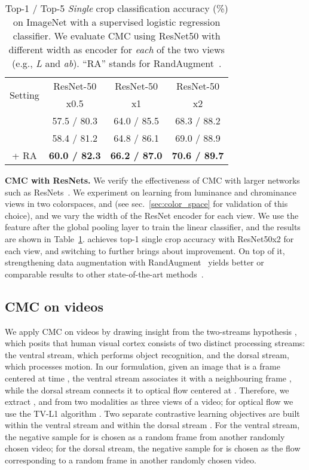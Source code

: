 \documentclass[10pt,twocolumn,letterpaper]{article}
\newcommand{\header}[1]{\vspace{0.05in}\noindent\textbf{#1}}
\newcommand{\citep}[1]{\cite{#1}}
\begin{document}
\begin{table}[t]
    \setlength{\tabcolsep}{5pt}
	\centering
    \begin{tabular}{c|ccc}
    \multirow{2}{*}{Setting} & ResNet-50 & ResNet-50 & ResNet-50 \\
     & x0.5 & x1 & x2 \\
    \shline
     &        57.5 / 80.3 & 64.0 / 85.5 & 68.3 / 88.2\\
     &      58.4 / 81.2 & 64.8 / 86.1 & 69.0 / 88.9\\
     + RA & \textbf{60.0 / 82.3} & \textbf{66.2 / 87.0} & \textbf{70.6 / 89.7}\\
    \end{tabular}
    \caption{\small{Top-1 / Top-5 \emph{Single} crop classification accuracy (\%) on ImageNet with a supervised logistic regression classifier. We evaluate CMC using ResNet50 with different width as encoder for \emph{each} of the two views (e.g., \emph{L} and \emph{ab}). ``RA'' stands for RandAugment~\cite{cubuk2019randaugment}.}}
    \vspace{-5pt}
    \label{tbl:resnet}
\end{table}
 \header{CMC with ResNets.} We verify the effectiveness of CMC with larger networks such as ResNets~\cite{he2016deep}. 
We experiment on learning from luminance and chrominance views in two colorspaces,  and  (see sec.~\ref{sec:color_space} for validation of this choice), and we vary the width of the ResNet encoder for each view. We use the feature after the global pooling layer to train the linear classifier, and the results are shown in Table~\ref{tbl:resnet}.  achieves  top-1 single crop accuracy with ResNet50x2 for each view, and switching to  further brings about  improvement. On top of it, strengthening data augmentation with RandAugment~\cite{cubuk2019randaugment} yields better or comparable results to other state-of-the-art methods~\cite{kolesnikov2019revisiting,wu2018unsupervised,zhuang2019local,he2019momentum,misra2019self,donahue2019large,henaff2019data,bachman2019learning}.

 \subsection{CMC on videos}\label{exp:video}
We apply CMC on videos by drawing insight from the two-streams hypothesis \citep{schneider1969two,goodale1992separate}, which posits that human visual cortex consists of two distinct processing streams: the ventral stream, which performs object recognition, and the dorsal stream, which processes motion. In our formulation, given an image  that is a frame centered at time , the ventral stream associates it with a neighbouring frame , while the dorsal stream connects it to optical flow  centered at . Therefore, we extract ,  and  from two modalities as three views of a video; for optical flow we use the TV-L1 algorithm \citep{zach2007duality}. Two separate contrastive learning objectives are built within the ventral stream  and within the dorsal stream . For the ventral stream, the negative sample for  is chosen as a random frame from another randomly chosen video; for the dorsal stream, the negative sample for  is chosen as the flow corresponding to a random frame in another randomly chosen video. 
\end{document}
